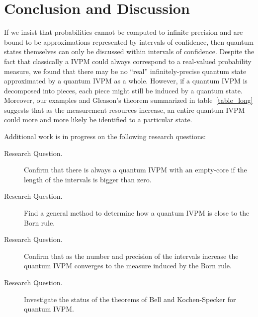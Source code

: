 \documentclass{article}
\theoremstyle{remark}
\begin{document}
\section{Conclusion and Discussion}

If we insist that probabilities cannot be computed to infinite precision
and are bound to be approximations represented by intervals of confidence,
then quantum states themselves can only be discussed within intervals
of confidence. Despite the fact that classically a IVPM could always
correspond to a real-valued probability measure, we found that there
may be no ``real'' infinitely-precise quantum state approximated
by a quantum IVPM as a whole. However, if a quantum IVPM is decomposed
into pieces, each piece might still be induced by a quantum state.
Moreover, our examples and Gleason's theorem summarized in table~\ref{table_long}
suggests that as the measurement resources increase, an entire quantum
IVPM could more and more likely be identified to a particular state.
\begin{table}[ht]
\caption{Relation between measurement resources and interval-valued probability
measures}
\label{table_long}
\end{table}
Additional work is in progress on the following research questions:
\begin{description}
\item [{Research Question.}] Confirm that there is always a quantum IVPM
with an empty-core if the length of the intervals is bigger than zero. 
\item [{Research Question.}] Find a general method to determine how a
quantum IVPM is close to the Born rule. 
\item [{Research Question.}] Confirm that as the number and precision
of the intervals increase the quantum IVPM converges to the measure
induced by the Born rule. 
\item [{Research Question.}] Investigate the status of the theorems of
Bell and Kochen-Specker for quantum IVPM.
\end{description}
\end{document}
